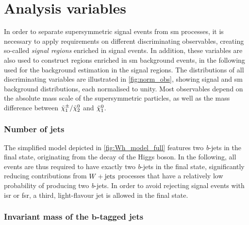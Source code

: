 \section{Analysis variables}\label{sec:variables}

In order to separate supersymmetric signal events from \gls{sm} processes, it is necessary to apply requirements on different discriminating observables, creating so-called \textit{signal regions} enriched in signal events. In addition, these variables are also used to construct regions enriched in \gls{sm} background events, in the following used for the background estimation in the signal regions. The distributions of all discriminating variables are illustrated in \cref{fig:norm_obs}, showing signal and \gls{sm} background distributions, each normalised to unity. Most observables depend on the absolute mass scale of the supersymmetric particles, as well as the mass difference between $\tilde{\chi}_1^\pm/\tilde{\chi}_2^0$ and $\tilde{\chi}_1^0$. 

\subsubsection{Number of jets}

The simplified model depicted in \cref{fig:Wh_model_full} features two \textit{b}-jets in the final state, originating from the decay of the Higgs boson. In the following, all events are thus required to have exactly two \textit{b}-jets in the final state, significantly reducing contributions from \eg $W+\mathrm{jets}$ processes that have a relatively low probability of producing two \textit{b}-jets. In order to avoid rejecting signal events with \gls{isr} or \gls{fsr}, a third, light-flavour jet is allowed in the final state.

\subsubsection[Invariant mass of the \textit{b}-tagged jets]{Invariant mass of the $\boldsymbol{b}$-tagged jets}

